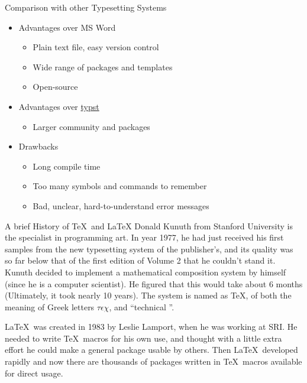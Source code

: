 \begin{frame}{Comparison with other Typesetting Systems}
    \begin{itemize}[<+->]
        \item Advantages over MS Word
        \begin{itemize}[<+->]
            \item Plain text file, easy version control
            \item Wide range of packages and templates
            \item Open-source
        \end{itemize}
        \item Advantages over \hyperlink{https://typst.app/}{typst}
        \begin{itemize}[<+->]
            \item Larger community and packages
        \end{itemize}
        \item Drawbacks
        \begin{itemize}[<+->]
            \item Long compile time
            \item Too many symbols and commands to remember
            \item Bad, unclear, hard-to-understand error messages
        \end{itemize}
    \end{itemize}    
\end{frame}

\begin{frame}{A brief History of \TeX\ and \LaTeX}
    Donald Kunuth from Stanford University is the specialist in programming art. In year 1977, he had just received his first samples from the new typesetting system of the publisher's, and its quality was so far below that of the first edition of Volume 2 that he couldn't stand it. Kunuth decided to implement a mathematical composition system by himself (since he is a computer scientist). He figured that this would take about 6 months (Ultimately, it took nearly 10 years). The system is named as \TeX, of both the meaning of Greek letters $\tau\epsilon\chi$, and ``technical ''. \medskip

    \pause

    \LaTeX\ was created in 1983 by Leslie Lamport, when he was working at SRI. He needed to write \TeX\ macros for his own use, and thought with a little extra effort he could make a general package usable by others. Then \LaTeX\  developed rapidly and now there are thousands of packages written in \TeX\ macros available for direct usage.

\end{frame}

